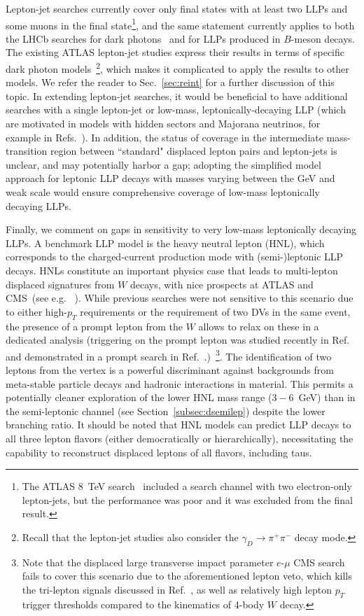 Lepton-jet searches currently cover only final states with at least two LLPs and some muons in the final state\footnote{The ATLAS 8~TeV search~\cite{Aad:2014yea} included a search channel with two electron-only lepton-jets, but the performance was poor and it was excluded from the final result.}, and the same statement currently applies to both the LHCb searches for dark photons~\cite{Aaij:2016rxn,Aaij:2017rft} 
 and for LLPs produced in $B$-meson decays. The existing ATLAS lepton-jet studies express their results in terms of specific dark photon models~\footnote{Recall that the lepton-jet studies also consider the $\gamma_D \to \pi^+ \pi^-$ decay mode.}, which makes it complicated to apply the results to other models. We refer the reader to Sec.~\ref{sec:reint} for a further discussion of this topic. In extending lepton-jet searches, it would be beneficial to have additional searches with a single lepton-jet or low-mass, leptonically-decaying LLP (which are motivated in models with hidden sectors and Majorana neutrinos, for example in Refs.~\cite{Izaguirre:2015pga,Izaguirre:2015zva}). In addition, the status of coverage in the intermediate mass-transition region between ``standard" displaced lepton pairs and lepton-jets is unclear, and may potentially harbor a gap; adopting the simplified model approach for leptonic LLP decays with masses varying between the GeV and weak scale would ensure comprehensive coverage of low-mass leptonically decaying LLPs. 

Finally, we comment on gaps in sensitivity to very low-mass leptonically decaying LLPs. A benchmark LLP model is the heavy neutral lepton (HNL), which corresponds to the charged-current production mode with (semi-)leptonic LLP decays. HNLs constitute an  important physics case that leads to multi-lepton displaced signatures from $W$ decays, with nice prospects at ATLAS and CMS~(see e.g.~ \cite{Izaguirre2015,Nemevsek:2018bbt,Cottin:2018kmq}). While previous searches were not sensitive to this scenario due to either high-$p_T$ requirements or the requirement of two DVs in the same event, the presence of a prompt lepton from the $W$ allows to relax on these in a dedicated analysis (triggering on the prompt lepton was studied recently in Ref.~\cite{Cottin:2018kmq} and demonstrated in a prompt search in Ref.~\cite{Sirunyan:2018mtv}.)~\footnote{Note that the displaced large transverse impact parameter $e$-$\mu$ CMS search~\cite{CMS-PAS-EXO-16-022} fails to cover this scenario due to the aforementioned lepton veto, which kills the tri-lepton signals discussed in Ref.~\cite{Izaguirre2015}, as well as relatively high lepton $p_T$ trigger thresholds compared to the kinematics of 4-body $W$ decay.}. 
The identification of two leptons from the vertex is a powerful discriminant against backgrounds from meta-stable particle decays and hadronic interactions in material. This permits a potentially cleaner exploration of the lower HNL mass range ($3-6$~GeV) than in the semi-leptonic channel (see Section~\ref{subsec:dsemilep}) despite the lower branching ratio. It should be noted that HNL models can predict LLP decays to all three lepton flavors (either democratically or hierarchically), necessitating the capability to reconstruct displaced leptons of all flavors, including taus. 

